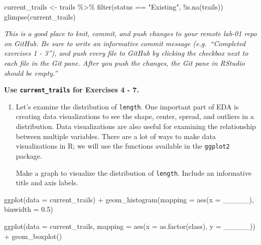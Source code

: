 \documentclass[
]{article}
\newenvironment{Shaded}{\begin{snugshade}}{\end{snugshade}}
\newcommand{\AttributeTok}[1]{\textcolor[rgb]{0.77,0.63,0.00}{#1}}
\newcommand{\FloatTok}[1]{\textcolor[rgb]{0.00,0.00,0.81}{#1}}
\newcommand{\FunctionTok}[1]{\textcolor[rgb]{0.00,0.00,0.00}{#1}}
\newcommand{\NormalTok}[1]{#1}
\newcommand{\OtherTok}[1]{\textcolor[rgb]{0.56,0.35,0.01}{#1}}
\newcommand{\SpecialCharTok}[1]{\textcolor[rgb]{0.00,0.00,0.00}{#1}}
\newcommand{\StringTok}[1]{\textcolor[rgb]{0.31,0.60,0.02}{#1}}
\begin{document}
\begin{Shaded}
\begin{Highlighting}[]
\NormalTok{current\_trails }\OtherTok{\textless{}{-}}\NormalTok{ trails }\SpecialCharTok{\%\textgreater{}\%}
  \FunctionTok{filter}\NormalTok{(status }\SpecialCharTok{==} \StringTok{"Existing"}\NormalTok{, }\SpecialCharTok{!}\FunctionTok{is.na}\NormalTok{(trails))}
\FunctionTok{glimpse}\NormalTok{(current\_trails)}
\end{Highlighting}
\end{Shaded}

\emph{This is a good place to knit, commit, and push changes to your
remote lab-01 repo on GitHub. Be sure to write an informative commit
message (e.g.~``Completed exercises 1 - 3''), and push every file to
GitHub by clicking the checkbox next to each file in the Git pane. After
you push the changes, the Git pane in RStudio should be empty.''}

\textbf{Use \texttt{current\_trails} for Exercises 4 - 7.}

\begin{enumerate}
\def\labelenumi{\arabic{enumi}.}
\setcounter{enumi}{3}
\item
  Let's examine the distribution of \texttt{length}. One important part
  of EDA is creating data visualizations to see the shape, center,
  spread, and outliers in a distribution. Data visualizations are also
  useful for examining the relationship between multiple variables.
  There are a lot of ways to make data visualizations in R; we will use
  the functions available in the \texttt{ggplot2} package.

  Make a graph to visualize the distribution of \texttt{length}. Include
  an informative title and axis labels.
\end{enumerate}

\begin{Shaded}
\begin{Highlighting}[]
\FunctionTok{ggplot}\NormalTok{(}\AttributeTok{data =}\NormalTok{ current\_trails) }\SpecialCharTok{+}
  \FunctionTok{geom\_histogram}\NormalTok{(}\AttributeTok{mapping =} \FunctionTok{aes}\NormalTok{(}\AttributeTok{x =}\NormalTok{ \_\_\_\_\_), }\AttributeTok{binwidth =} \FloatTok{0.5}\NormalTok{)}

\FunctionTok{ggplot}\NormalTok{(}\AttributeTok{data =}\NormalTok{ current\_trails, }\AttributeTok{mapping =} \FunctionTok{aes}\NormalTok{(}\AttributeTok{x =} \FunctionTok{as.factor}\NormalTok{(class), }\AttributeTok{y =}\NormalTok{ \_\_\_\_\_)) }\SpecialCharTok{+}
  \FunctionTok{geom\_boxplot}\NormalTok{()}
\end{Highlighting}
\end{Shaded}
\end{document}

